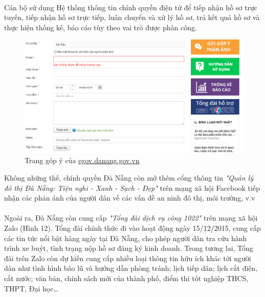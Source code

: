 \documentclass[a4paper]{article}
\begin{document}
\\
Cán bộ sử dụng Hệ thống thông tin chính quyền điện tử để tiếp nhận hồ sơ trực tuyến, tiếp nhận hồ sơ trực tiếp, luân chuyển và xử lý hồ sơ, trả kết quả hồ sơ và thực hiện thống kê, báo cáo tùy theo vai trò được phân công.
\begin{center}
    \begin{figure}[h]
    \begin{center}
     \includegraphics[scale=.55]{gopy-danang.PNG}
    \end{center}
    \caption{Trang góp ý của \url{egov.danang.gov.vn}}
    \label{refhinh7}
    \end{figure}
\end{center}
Không những thế, chính quyền Đà Nẵng còn mở thêm cổng thông tin \textit{"Quản lý đô thị Đà Nẵng: Tiện nghi - Xanh - Sạch - Đẹp"} trên mạng xã hội Facebook tiếp nhận các phản ánh của người dân về các vấn đề an ninh đô thị, môi trường, v.v\\
\\
Ngoài ra, Đà Nẵng còn cung cấp \textit{"Tổng đài dịch vụ công 1022"} trên mạng xã hội Zalo (Hình 12). Tổng đài chính thức đi vào hoạt động ngày 15/12/2015, cung cấp các tin tức nổi bật hàng ngày tại Đà Nẵng, cho phép người dân tra cứu hành trình xe buýt, tình trạng nộp hồ sơ đăng ký kinh doanh. Trong tương lai, Tổng đài trên Zalo còn dự kiến cung cấp nhiều loại thông tin hữu ích khác tới người dân như tình hình bão lũ và hướng dẫn phòng tránh; lịch tiếp dân; lịch cắt điện, cắt nước; văn bản, chính sách mới của thành phố, điểm thi tốt nghiệp THCS, THPT, Đại học…
\end{document}
